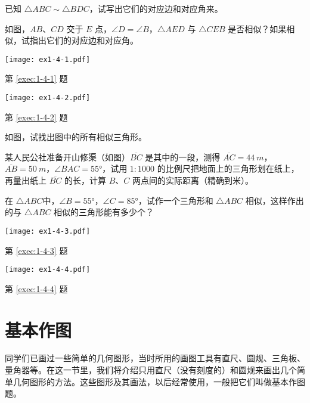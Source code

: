 \begin{Exercise}
\begin{question}
	\item\label{exec:1-4-1} 已知 $\triangle ABC \sim \triangle BDC$，试写出它们的对应边和对应角来。
	\item\label{exec:1-4-2} 如图，$AB$、$CD$ 交于 $E$ 点，$\angle D=\angle B$，$\triangle AED$ 与 $\triangle CEB$ 是否相似？如果相似，试指出它们的对应边和对应角。
	\begin{figurehere}
		\begin{minipage}[b]{0.48\linewidth}
			\centering
			\texttt{[image: ex1-4-1.pdf]}
			\caption*{第 \ref{exec:1-4-1} 题}
		\end{minipage}
		\begin{minipage}[b]{0.48\linewidth}
			\centering
			\texttt{[image: ex1-4-2.pdf]}
			\caption*{第 \ref{exec:1-4-2} 题}
		\end{minipage}
	\end{figurehere}
	\item\label{exec:1-4-3} 如图，试找出图中的所有相似三角形。
	\item\label{exec:1-4-4} 某人民公社准备开山修渠（如图）$\overline{BC}$ 是其中的一段，测得 $\overline{AC}=\qty{44}{m}$，$\overline{AB}=\qty{50}{m}$，$\angle BAC=\ang{55}$，试用 $1:1000$ 的比例尺把地面上的三角形划在纸上，再量出纸上 $\overline{BC}$ 的长，计算 $B$、$C$ 两点间的实际距离（精确到米）。
	\item 在 $\triangle ABC$中，$\angle B=\ang{55}$，$\angle C=\ang{85}$，试作一个三角形和 $\triangle ABC$ 相似，这样作出的与 $\triangle ABC$ 相似的三角形能有多少个？
	\begin{figurehere}
		\begin{minipage}[b]{0.52\linewidth}
			\centering
			\texttt{[image: ex1-4-3.pdf]}
			\caption*{第 \ref{exec:1-4-3} 题}
		\end{minipage}
		\begin{minipage}[b]{0.46\linewidth}
			\centering
			\texttt{[image: ex1-4-4.pdf]}
		\caption*{第 \ref{exec:1-4-4} 题}
		\end{minipage}
	\end{figurehere}
\end{question}
\end{Exercise}

\section{基本作图}
同学们已画过一些简单的几何图形，当时所用的画图工具有直尺、圆规、三角板、量角器等。在这一节里，我们将介绍只用直尺（没有刻度的）和圆规来画出几个简单几何图形的方法。这些图形及其画法，以后经常使用，一般把它们叫做基本作图题。

